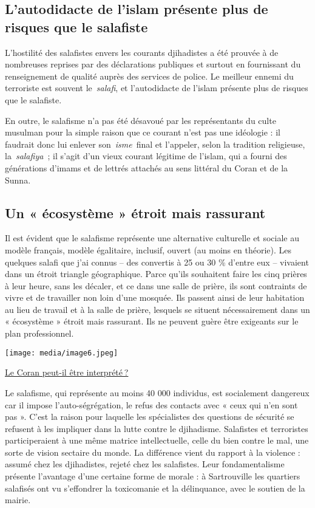 \subsection{L'autodidacte de l'islam présente plus de risques que le
salafiste}

L'hostilité des salafistes envers les courants djihadistes a été prouvée
à de nombreuses reprises par des déclarations publiques et surtout en
fournissant du renseignement de qualité auprès des services de police.
Le meilleur ennemi du terroriste est souvent le~\emph{salafi}, et
l'autodidacte de l'islam présente plus de risques que le salafiste.

En outre, le salafisme n'a pas été désavoué par les représentants du
culte musulman pour la simple raison que ce courant n'est pas une
idéologie : il faudrait donc lui enlever son~\emph{isme}~final et
l'appeler, selon la tradition religieuse, la~\emph{salafiya~}; il s'agit
d'un vieux courant légitime de l'islam, qui a fourni des générations
d'imams et de lettrés attachés au sens littéral du Coran et de la Sunna.

\subsection{Un « écosystème » étroit mais rassurant}

Il est évident que le salafisme représente une alternative culturelle et
sociale au modèle français, modèle égalitaire, inclusif, ouvert (au
moins en théorie). Les quelques salafi que j'ai connus -- des convertis
à 25 ou 30 \% d'entre eux -- vivaient dans un étroit triangle
géographique. Parce qu'ils souhaitent faire les cinq prières à leur
heure, sans les décaler, et ce dans une salle de prière, ils sont
contraints de vivre et de travailler non loin d'une mosquée. Ils passent
ainsi de leur habitation au lieu de travail et à la salle de prière,
lesquels se situent nécessairement dans un « écosystème » étroit mais
rassurant. Ils ne peuvent guère être exigeants sur le plan
professionnel.

\texttt{[image: media/image6.jpeg]}

\href{https://www.la-croix.com/Religion/Le-Coran-peut-etre-interprete-2021-01-25-1201136852}{Le
Coran peut-il être interprété ?}

Le salafisme, qui représente au moins 40 000 individus, est socialement
dangereux car il impose l'auto-ségrégation, le refus des contacts avec «
ceux qui n'en sont pas ». C'est la raison pour laquelle les spécialistes
des questions de sécurité se refusent à les impliquer dans la lutte
contre le djihadisme. Salafistes et terroristes participeraient à une
même matrice intellectuelle, celle du bien contre le mal, une sorte de
vision sectaire du monde. La différence vient du rapport à la violence :
assumé chez les djihadistes, rejeté chez les salafistes. Leur
fondamentalisme présente l'avantage d'une certaine forme de morale : à
Sartrouville les quartiers salafisés ont vu s'effondrer la toxicomanie
et la délinquance, avec le soutien de la mairie.


